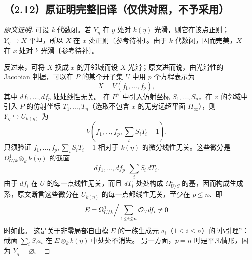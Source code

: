 \subsection*{（2.12）原证明完整旧译（仅供对照，不予采用）}
\begin{proof}[原文证明]
可设 $k$ 代数闭。若 $Y_\eta$ 在 $y$ 处对 $k(\eta)$ 光滑，则它在该点正则；$Y_\eta\to X$ 平坦，所以 $X$ 在 $x$ 处正则〔参考待补〕。由于 $k$ 代数闭，因而完美，$X$ 在 $x$ 处对 $k$ 光滑〔参考待补〕。

反过来，可将 $X$ 换成 $x$ 的开邻域而设 $X$ 光滑；原文进而说，由光滑性的 Jacobian 判据，可以在 $P$ 的某个开子集 $U$ 中用 $p$ 个方程表示为
\[
 X=V(f_1,\ldots,f_p),
\]
其中 $df_1,\ldots,df_p$ 处处线性无关。
在 $P^\vee$ 中引入仿射坐标 $S_1,\ldots,S_n$，在 $x$ 的邻域中引入 $P$ 的仿射坐标 $T_1,\ldots,T_n$（选取不包含 $x$ 的无穷远超平面 $H_\infty$），则 $Y_\eta\hookrightarrow U_{k(\eta)}$ 为
\[
 V\left(f_1,\ldots,f_p,\sum_iS_iT_i-1\right).
\]
只须验证 $f_1,\ldots,f_p,\sum_iS_iT_i-1$ 相对于 $k(\eta)$ 的微分线性无关。这些微分是 $\Omega^1_{U/k}\otimes_kk(\eta)$ 的截面
\[
 df_1,\ldots,df_p,\sum_iS_i\,dT_i.
\]
由于 $df_i$ 在 $U$ 的每一点线性无关，而且 $dT_i$ 处处构成 $\Omega^1_{U/S}$ 的基，因而构成生成系，原文断言这些微分在 $U_{k(\eta)}$ 的每一点都线性无关，至少在 $p\leq n$、即
\[
 E=\Omega^1_{U/k}\Big/\sum_{1\leq i\leq n}\OO_Udf_i\ne0
\]
时如此。
这是关于非零局部自由模 $E$ 的一族生成元 $a_i$（$1\leq i\leq n$）的“小引理”：截面 $\sum_iS_ia_i$ 在 $E\otimes_kk(\eta)$ 中处处不消失。
另一方面，$p=n$ 时是平凡情形，因为 $Y_\eta=\varnothing$。
\end{proof}


\hypertarget{D18-090-notes}{}
\begingroup
\def\OO{\mathcal O}\def\FF{\mathcal F}\def\GG{\mathcal G}
\def\PP{\mathbf P}\def\calP{\mathcal P}\def\dd{\delta}
\def\Div{\operatorname{Div}}\def\depth{\operatorname{depth}}
\def\pr{\operatorname{pr}}\def\coker{\operatorname{coker}}
